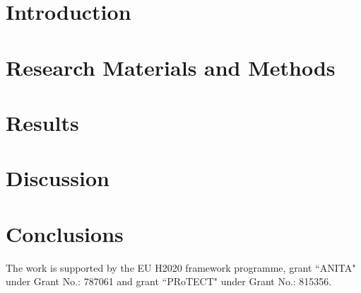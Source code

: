 \documentclass[manuscript, review, screen, CSUR]{acmart}
\begin{document}
\section{Introduction}


\section{Research Materials and Methods}\label{mm}


\section{Results}\label{res}


\section{Discussion}\label{disc}


\section{Conclusions}\label{conc}


\begin{acks}
The work is supported by the EU H2020  framework programme, grant ``ANITA" under Grant No.: 787061 and grant ``PRoTECT" under Grant No.: 815356.
\end{acks}



\end{document}
